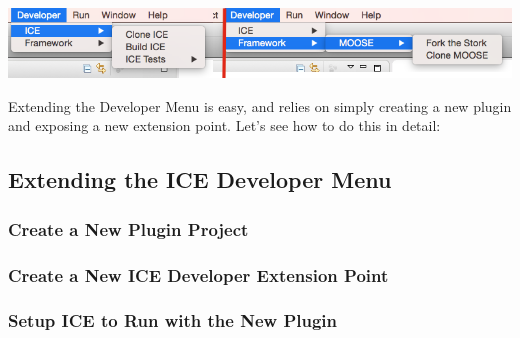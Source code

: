 \documentclass{article}
\begin{document}
\begin{center}
\includegraphics[width=\textwidth]{figures/menu.png}
\label{fig:devcloneice}
\end{center}

Extending the Developer Menu is easy, and relies on simply creating a new plugin
and exposing a new extension point. Let's see how to do this in detail:

\subsection{Extending the ICE Developer Menu}
\subsubsection{Create a New Plugin Project}
\subsubsection{Create a New ICE Developer Extension Point}
\subsubsection{Setup ICE to Run with the New Plugin}
\end{document}
